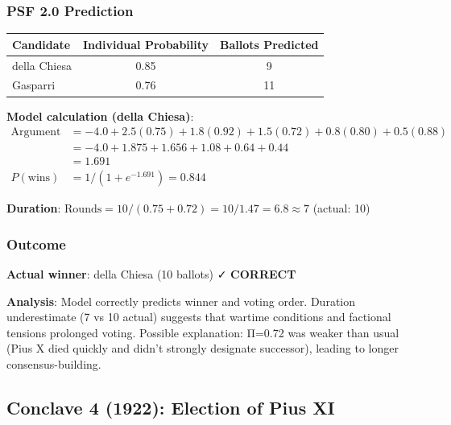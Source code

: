 \subsubsection{PSF 2.0 Prediction}

\begin{center}
\begin{tabular}{lcc}
\toprule
\textbf{Candidate} & \textbf{Individual Probability} & \textbf{Ballots Predicted} \\
\midrule
della Chiesa & 0.85 & 9 \\
Gasparri & 0.76 & 11 \\
\bottomrule
\end{tabular}
\end{center}

\textbf{Model calculation (della Chiesa)}:
\begin{equation}
\begin{split}
\text{Argument} &= -4.0 + 2.5(0.75) + 1.8(0.92) + 1.5(0.72) + 0.8(0.80) + 0.5(0.88) \\
&= -4.0 + 1.875 + 1.656 + 1.08 + 0.64 + 0.44 \\
&= 1.691 \\
P(\text{wins}) &= 1 / (1 + e^{-1.691}) = 0.844
\end{split}
\end{equation}

\textbf{Duration}: $\text{Rounds} = 10 / (0.75 + 0.72) = 10 / 1.47 = 6.8 \approx 7$ (actual: 10)

\subsubsection{Outcome}

\textbf{Actual winner}: della Chiesa (10 ballots) ✓ \textbf{CORRECT}

\textbf{Analysis}: Model correctly predicts winner and voting order. Duration underestimate (7 vs 10 actual) suggests that wartime conditions and factional tensions prolonged voting. Possible explanation: Π=0.72 was weaker than usual (Pius X died quickly and didn't strongly designate successor), leading to longer consensus-building.


\subsection{Conclave 4 (1922): Election of Pius XI}

